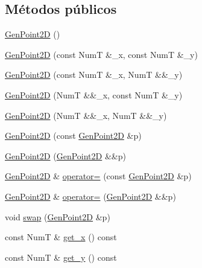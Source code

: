 \subsection*{Métodos públicos}
\begin{DoxyCompactItemize}
\item 
\hyperlink{class_designar_1_1_gen_point2_d_aa55395ebde205564d3065dc6ce56c42b}{Gen\+Point2D} ()
\item 
\hyperlink{class_designar_1_1_gen_point2_d_adf5298d432b48187deef32941429a1b3}{Gen\+Point2D} (const NumT \&\+\_\+x, const NumT \&\+\_\+y)
\item 
\hyperlink{class_designar_1_1_gen_point2_d_a7e3357422dc01310240f58fed213162d}{Gen\+Point2D} (const NumT \&\+\_\+x, NumT \&\&\+\_\+y)
\item 
\hyperlink{class_designar_1_1_gen_point2_d_ab4e177989279ac6e6f7280644f487cdd}{Gen\+Point2D} (NumT \&\&\+\_\+x, const NumT \&\+\_\+y)
\item 
\hyperlink{class_designar_1_1_gen_point2_d_a420eb654ce7cbb0a9f179c20db4e7c98}{Gen\+Point2D} (NumT \&\&\+\_\+x, NumT \&\&\+\_\+y)
\item 
\hyperlink{class_designar_1_1_gen_point2_d_abb677c76a6cfb8261f562250a15ca879}{Gen\+Point2D} (const \hyperlink{class_designar_1_1_gen_point2_d}{Gen\+Point2D} \&p)
\item 
\hyperlink{class_designar_1_1_gen_point2_d_a025c72ba6681c75f131066d1a5fc5e72}{Gen\+Point2D} (\hyperlink{class_designar_1_1_gen_point2_d}{Gen\+Point2D} \&\&p)
\item 
\hyperlink{class_designar_1_1_gen_point2_d}{Gen\+Point2D} \& \hyperlink{class_designar_1_1_gen_point2_d_a5561fbdf0a23f90f9f3c1fdce25c2f3a}{operator=} (const \hyperlink{class_designar_1_1_gen_point2_d}{Gen\+Point2D} \&p)
\item 
\hyperlink{class_designar_1_1_gen_point2_d}{Gen\+Point2D} \& \hyperlink{class_designar_1_1_gen_point2_d_a83a1f3723cbcdf6fa556e864269a63f6}{operator=} (\hyperlink{class_designar_1_1_gen_point2_d}{Gen\+Point2D} \&\&p)
\item 
void \hyperlink{class_designar_1_1_gen_point2_d_a1068ce1c6fbaa5c448044529ec3659e0}{swap} (\hyperlink{class_designar_1_1_gen_point2_d}{Gen\+Point2D} \&p)
\item 
const NumT \& \hyperlink{class_designar_1_1_gen_point2_d_a5b30afaea1584891bdbe00b72440374b}{get\+\_\+x} () const
\item 
const NumT \& \hyperlink{class_designar_1_1_gen_point2_d_ac8aa7a258e736f715b1e164206316f79}{get\+\_\+y} () const
\item 

\end{DoxyCompactItemize}
